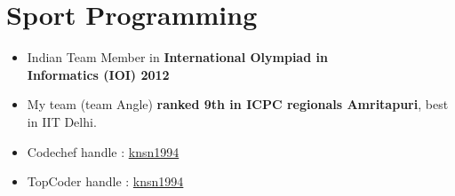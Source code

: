 \documentclass[10pt]{article} %
\begin{document}
{\begin{minipage}[t]{0.5\textwidth}

\section{Sport Programming} 
\begin{itemize} \itemsep 1pt
\item Indian Team Member in {\bf International Olympiad in \\ Informatics (IOI) 2012}  
\item My team (team Angle) {\bf ranked 9th in ICPC regionals Amritapuri}, best in IIT Delhi.
\item Codechef handle : \href{http://www.codechef.com/users/knsn1994}{knsn1994}
\item TopCoder handle : \href{http://community.topcoder.com/tc?module=MemberProfile&cr=22917652}{knsn1994}
\end{itemize}



\end{minipage}}
\end{document}
